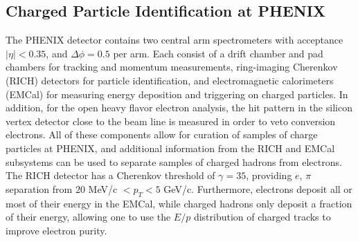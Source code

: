 \documentclass[submission, Proceedings]{SciPost}
\begin{document}
\subsection{Charged Particle Identification at PHENIX}\label{sec:detector}
The PHENIX detector contains two central arm spectrometers with acceptance $\mid \eta \mid < 0.35$, and $\Delta \phi = 0.5$ per arm. Each consist of a drift chamber and pad chambers for tracking and momentum measurements, ring-imaging Cherenkov (RICH) detectors for particle identification, and electromagnetic calorimeters (EMCal) for measuring energy deposition and triggering on charged particles. In addition, for the open heavy flavor electron analysis, the hit pattern in the silicon vertex detector close to the beam line is measured in order to veto conversion electrons. All of these components allow for curation of samples of charge particles at PHENIX, and additional information from the RICH and EMCal subsystems can be used to separate samples of charged hadrons from electrons. The RICH detector has a Cherenkov threshold of $\gamma = 35$, providing $e$, $\pi$ separation from $20$ MeV/c $< p_{T} < 5$ GeV/c. Furthermore, electrons deposit all or most of their energy in the EMCal, while charged hadrons only deposit a fraction of their energy, allowing one to use the $E/p$ distribution of charged tracks to improve electron purity. 
\end{document}
